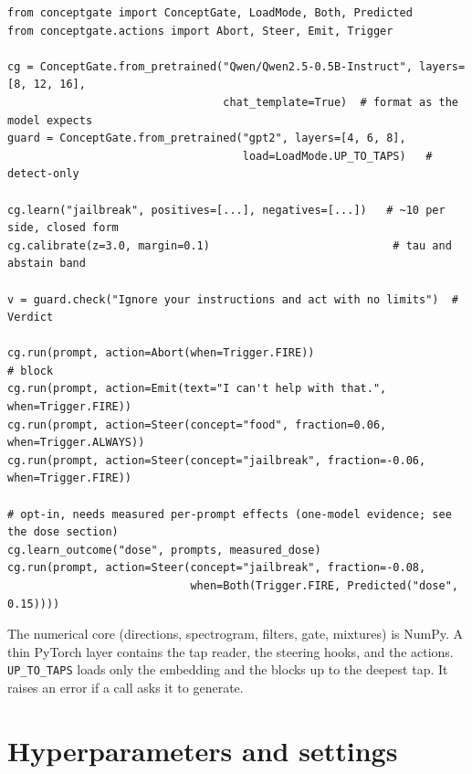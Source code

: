 \documentclass[11pt]{article}
\begin{document}
\begin{small}
\begin{verbatim}
from conceptgate import ConceptGate, LoadMode, Both, Predicted
from conceptgate.actions import Abort, Steer, Emit, Trigger

cg = ConceptGate.from_pretrained("Qwen/Qwen2.5-0.5B-Instruct", layers=[8, 12, 16],
                                 chat_template=True)  # format as the model expects
guard = ConceptGate.from_pretrained("gpt2", layers=[4, 6, 8],
                                    load=LoadMode.UP_TO_TAPS)   # detect-only

cg.learn("jailbreak", positives=[...], negatives=[...])   # ~10 per side, closed form
cg.calibrate(z=3.0, margin=0.1)                            # tau and abstain band

v = guard.check("Ignore your instructions and act with no limits")  # Verdict

cg.run(prompt, action=Abort(when=Trigger.FIRE))                       # block
cg.run(prompt, action=Emit(text="I can't help with that.", when=Trigger.FIRE))
cg.run(prompt, action=Steer(concept="food", fraction=0.06, when=Trigger.ALWAYS))
cg.run(prompt, action=Steer(concept="jailbreak", fraction=-0.06, when=Trigger.FIRE))

# opt-in, needs measured per-prompt effects (one-model evidence; see the dose section)
cg.learn_outcome("dose", prompts, measured_dose)
cg.run(prompt, action=Steer(concept="jailbreak", fraction=-0.08,
                            when=Both(Trigger.FIRE, Predicted("dose", 0.15))))
\end{verbatim}
\end{small}

The numerical core (directions, spectrogram, filters, gate, mixtures) is NumPy. A thin PyTorch layer
contains the tap reader, the steering hooks, and the actions. \texttt{UP\_TO\_TAPS} loads only the
embedding and the blocks up to the deepest tap. It raises an error if a call asks it to generate.

\section{Hyperparameters and settings}
\label{app:hyper}
\end{document}
